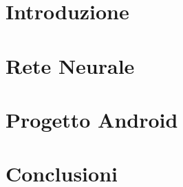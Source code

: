\documentclass[12pt,a4paper,openright,twoside]{book}
\begin{document}
\frontmatter



\tableofcontents
\newpage
\listoffigures
\newpage

\mainmatter

\chapter{Introduzione}
\label{cha:introduzione}


\chapter{Rete Neurale}
\label{cha:reteneurale}


\chapter{Progetto Android}
\label{cha:progettoandroid}


\chapter{Conclusioni}
\label{cha:conclusioni}




\end{document}
